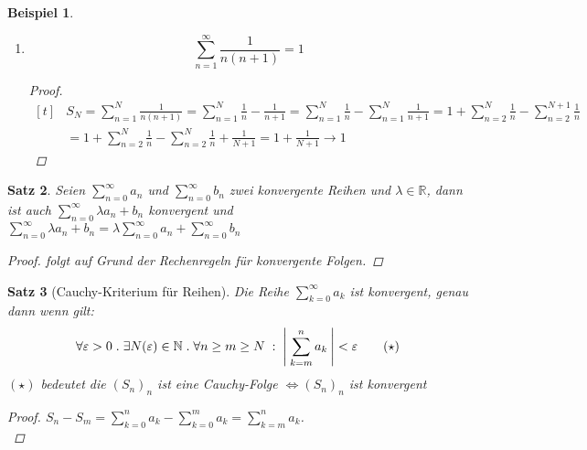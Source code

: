 \documentclass[a4paper,titlepage,oneside]{article}
\def\N{\ensuremath{\mathbb{N}} }
\def\R{\ensuremath{\mathbb{R}} }
\renewcommand{\epsilon}{\ensuremath{\varepsilon} }
\def\sp{\hspace{0,1cm}}
\def\spdot{\sp.\sp}
\def\spcolon{\sp:\sp}
\newcommand{\suminf}[2][n]{\ensuremath{\sum_{#1= 0}^{\infty}{#2}}}
\newcommand{\Suminf}[2][n]{\ensuremath{\sum_{#1=1}^{\infty}{#2}}}
\newcommand{\abs}[1]{\ensuremath{\left|\:#1\:\right|}}
\theoremstyle{thmstyle}
\newtheorem{satz}{Satz}[section]
\newtheorem{bsp}[satz]{Beispiel}
\theoremstyle{subthmstyle}
\begin{document}
\begin{bsp}
\begin{enumerate}
\begin{proof}
Würde \((S_N)_{N\ge1}\) konvergieren, dann auch die Teilfolge \((S_{2^N})_{N \ge 1}\), da diese dievergiert, divergiert auch \((S_N)_N\)\\
\end{proof}

\item
\[ \Suminf{\frac{1}{n(n+1)}}= 1 \]

\begin{proof}
\begin{math}\displaystyle \begin{aligned}[t]
&S_N = \sum_{n=1}^{N}{\frac{1}{n(n+1)}} = \sum_{n=1}^{N}{\frac{1}{n}} - \frac{1}{n+1} = \sum_{n=1}^{N}{\frac{1}{n}} - \sum_{n=1}^{N}{\frac{1}{n+1}}
= 1 + \sum_{n=2}^{N}{\frac{1}{n}} - \sum_{n=2}^{N+1}{\frac{1}{n}} \\
&= 1 + \sum_{n=2}^{N}{\frac{1}{n}} - \sum_{n=2}^{N}{\frac{1}{n}} + \frac{1}{N+1}
= 1 + \frac{1}{N+1} \longrightarrow 1
\end{aligned}\end{math} 
\end{proof}

\end{enumerate}
\end{bsp}

\begin{satz}
Seien \suminf{a_n} und \suminf{b_n} zwei konvergente Reihen und \(\lambda \in \R\),
dann ist auch \(\suminf{\lambda a_n + b_n}\) konvergent und \(\suminf{\lambda a_n + b_n} = \lambda \suminf{a_n} + \suminf{b_n}\)
\begin{proof}
folgt auf Grund der Rechenregeln für konvergente Folgen.
\end{proof}
\end{satz}

\begin{satz}[Cauchy-Kriterium für Reihen]
Die Reihe \(\suminf[k]{a_k}\) ist konvergent, genau dann wenn gilt:
\[\forall \epsilon > 0 \spdot \exists N(\epsilon) \in \N \spdot \forall n \ge m \ge N \spcolon \abs{\sum_{k=m}^{n}{a_k}} < \epsilon \qquad (\star)\]
\((\star)\) bedeutet die \((S_n)_n\) ist eine Cauchy-Folge \(\Leftrightarrow (S_n)_n\) ist konvergent
\begin{proof}
\(S_n - S_m = \sum_{k=0}^{n}{a_k} - \sum_{k=0}^{m}{a_k} = \sum_{k=m}^{n}{a_k}\).\\
\end{proof}
\end{satz}
\end{document}
